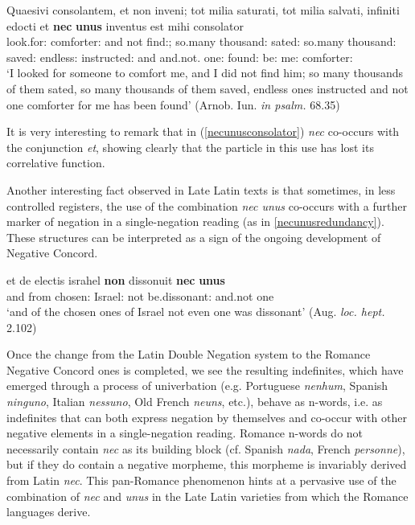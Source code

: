 \documentclass[output=paper,modfonts,nonflat,citecolor=brown,
showindex
]{langsci/langscibook}
\begin{document}
{\begin{exe}
\ex \label{necunusconsolator} \gll Quaesivi consolantem, et non inveni; tot milia saturati, tot milia salvati, infiniti edocti et {\bf{nec}} {\bf{unus}} inventus est mihi consolator\\
look.for:{} comforter:{} and not find:{}; so.many thousand:{} sated:{} so.many thousand:{} saved:{} endless:{} instructed:{} and and.not. one:{} found:{} be:{} me:{} comforter:{}\\  

`I looked for someone to comfort me, and I did not find him; so many thousands of them sated, so many thousands of them saved, endless ones instructed and not one comforter for me has been found' (Arnob. Iun. {\em{in psalm.}} 68.35)
\end{exe}}

\noindent It is very interesting to remark that in (\ref{necunusconsolator}) {\em{nec}} co-occurs with the conjunction {\em{et}}, showing clearly that the particle in this use has lost its correlative function.

Another interesting fact observed in Late Latin texts is that sometimes, in less controlled registers, the use of the combination {\em{nec unus}} co-occurs with a further marker of negation in a single-negation reading (as in \ref{necunusredundancy}). These structures can be interpreted as a sign of the ongoing development of Negative Concord.

{\begin{exe}
\ex \label{necunusredundancy} \gll et de electis israhel {\bf{non}} dissonuit {\bf{nec}} {\bf{unus}}\\
and from chosen:{} Israel:{} not be.dissonant:{} and.not one\\ 

`and of the chosen ones of Israel not even one was dissonant' (Aug. {\em{loc. hept.}} 2.102)
\end{exe}}

\noindent Once the change from the Latin Double Negation system to the Romance Negative Concord ones is completed, we see the resulting indefinites, which have emerged through a process of univerbation (e.g. Portuguese {\em{nenhum}}, Spanish {\em{ninguno}}, Italian {\em{nessuno}}, Old French {\em{neuns}}, etc.), behave as n-words, i.e. as indefinites that can both express negation by themselves and co-occur with other negative elements in a single-negation reading. Romance n-words do not necessarily contain {\em{nec}} as its building block (cf. Spanish {\em{nada}}, French {\em{personne}}), but if they do contain a negative morpheme, this morpheme is invariably derived from Latin {\em{nec}}. This pan-Romance phenomenon hints at a pervasive use of the combination of {\em{nec}} and {\em{unus}} in the Late Latin varieties from which the Romance languages derive.
\end{document}
